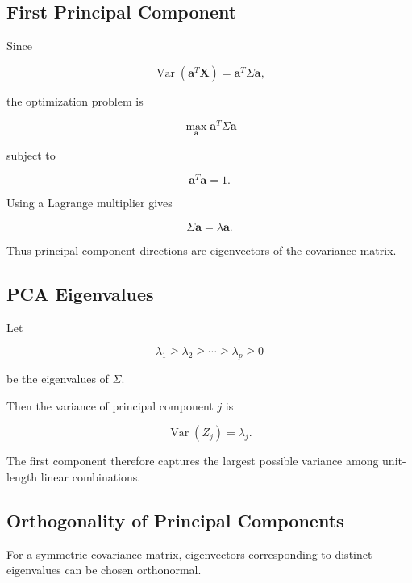 \subsection{First Principal Component}
\label{subsec:first-principal-component}

Since

\[
\operatorname{Var}
(
\mathbf{a}^T\mathbf{X}
)
=
\mathbf{a}^T
\Sigma
\mathbf{a},
\]

the optimization problem is

\[
\boxed{
\max_{\mathbf{a}}
\mathbf{a}^T
\Sigma
\mathbf{a}
}
\]

subject to

\[
\boxed{
\mathbf{a}^T\mathbf{a}=1.
}
\]

Using a Lagrange multiplier gives

\[
\boxed{
\Sigma\mathbf{a}
=
\lambda\mathbf{a}.
}
\]

Thus principal-component directions are eigenvectors of the covariance
matrix.

\subsection{PCA Eigenvalues}
\label{subsec:pca-eigenvalues}

Let

\[
\lambda_1
\geq
\lambda_2
\geq
\cdots
\geq
\lambda_p
\geq0
\]

be the eigenvalues of \(\Sigma\).

Then the variance of principal component \(j\) is

\[
\boxed{
\operatorname{Var}(Z_j)
=
\lambda_j.
}
\]

The first component therefore captures the largest possible variance
among unit-length linear combinations.

\subsection{Orthogonality of Principal Components}
\label{subsec:pca-orthogonality}

For a symmetric covariance matrix, eigenvectors corresponding to distinct
eigenvalues can be chosen orthonormal.

